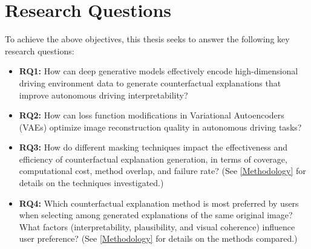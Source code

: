 \section{Research Questions}
To achieve the above objectives, this thesis seeks to answer the following key research questions:

\begin{itemize}
    \item \textbf{RQ1:} How can deep generative models effectively encode high-dimensional driving environment data to generate counterfactual explanations that improve autonomous driving interpretability?

    \item \textbf{RQ2:} How can loss function modifications in Variational Autoencoders (VAEs) optimize image reconstruction quality in autonomous driving tasks? 
    
    \item \textbf{RQ3:} How do different masking techniques impact the effectiveness and efficiency of counterfactual explanation generation, in terms of coverage, computational cost, method overlap, and failure rate?  (See \cref{Methodology} for details on the techniques investigated.) 

    \item \textbf{RQ4:} Which counterfactual explanation method is most preferred by users when selecting among generated explanations of the same original image? What factors (interpretability, plausibility, and visual coherence) influence user preference? (See \cref{Methodology} for details on the methods compared.)


\end{itemize}

